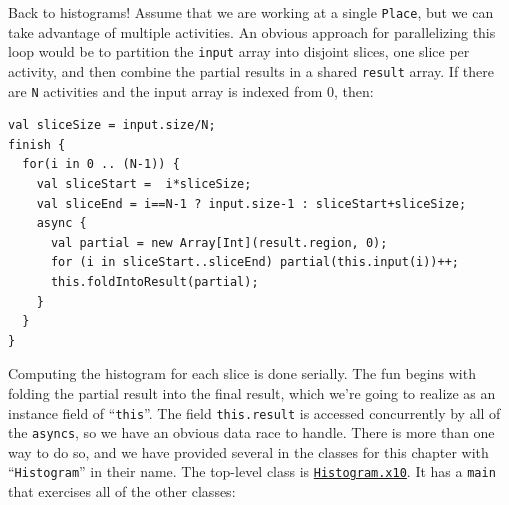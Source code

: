 Back to histograms!
Assume that we are working at a single {\tt Place}, but we can take
advantage of multiple activities.  An obvious approach for parallelizing
this loop would be to partition
the {\tt input} array into disjoint slices, one slice per activity, and then combine
the partial results in a shared {\tt result} array.  If there are {\tt N}
activities and the input array is indexed from 0, then:
\begin{verbatim}
val sliceSize = input.size/N;
finish {
  for(i in 0 .. (N-1)) {
    val sliceStart =  i*sliceSize;
    val sliceEnd = i==N-1 ? input.size-1 : sliceStart+sliceSize;
    async {
      val partial = new Array[Int](result.region, 0);
      for (i in sliceStart..sliceEnd) partial(this.input(i))++;
      this.foldIntoResult(partial);
    }
  }
}
\end{verbatim}
Computing the histogram for each slice is done serially.  The fun begins with folding
the partial result into the final result, which we're going to realize as an instance field
of ``{\tt this}''.   The field {\tt this.result}
is accessed concurrently by all of the {\tt asyncs}, so we have an obvious data race to
handle.  There is more than one way to do so, and we have provided several in
the classes for this chapter with ``{\tt Histogram}'' in their name.
The top-level
class is \href{src/concurrency/Histogram.x10}{{\tt Histogram.x10}}.  It has a {\tt main} that
exercises all of the other classes:

